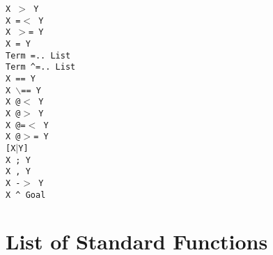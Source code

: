 \begin{tabbing}
 \> {\tt X $>$ Y}		\>					\\
 \> {\tt X =$<$ Y}		\>					\\
 \> {\tt X $>$= Y}		\>					\\
 \> {\tt X = Y}			\>					\\
 \> {\tt Term =.. List}		\>					\\
 \> {\tt Term \verb'^'=.. List}	\>					\\
 \> {\tt X == Y}		\>					\\
 \> {\tt X $\backslash$== Y}	\>					\\
 \> {\tt X @$<$ Y}		\>					\\
 \> {\tt X @$>$ Y}		\>					\\
 \> {\tt X @=$<$ Y}		\>					\\
 \> {\tt X @$>$= Y}		\>					\\
 \> {\tt [X$|$Y]}		\>					\\
 \> {\tt X ; Y}			\>					\\
 \> {\tt X , Y}			\>					\\
 \> {\tt X -$>$ Y}		\>					\\
 \> {\tt X \verb'^' Goal}	\>					\\
\end{tabbing}



\section{List of Standard Functions}

